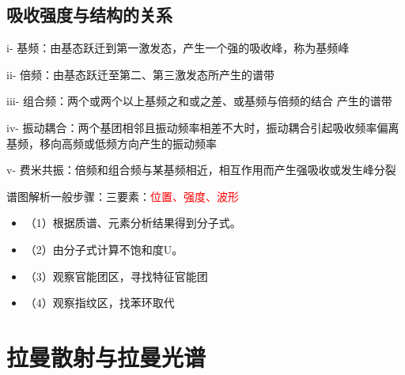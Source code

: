 \subsection{吸收强度与结构的关系}
    i- 基频：由基态跃迁到第一激发态，产生一个强的吸收峰，称为基频峰

    ii- 倍频：由基态跃迁至第二、第三激发态所产生的谱带

    iii- 组合频：两个或两个以上基频之和或之差、或基频与倍频的结合 产生的谱带

    iv- 振动耦合：两个基团相邻且振动频率相差不大时，振动耦合引起吸收频率偏离基频，移向高频或低频方向产生的振动频率

    v- 费米共振：倍频和组合频与某基频相近，相互作用而产生强吸收或发生峰分裂
\begin{note}
    谱图解析一般步骤：三要素：\textcolor{red}{位置、强度、波形}
    \begin{itemize}
        \item （1）根据质谱、元素分析结果得到分子式。
        \item （2）由分子式计算不饱和度U。
        \item （3）观察官能团区，寻找特征官能团
        \item （4）观察指纹区，找苯环取代
    \end{itemize}
\end{note}

\section{拉曼散射与拉曼光谱}
